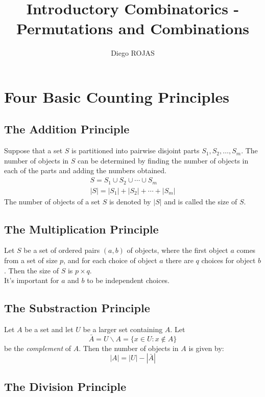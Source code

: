 \documentclass[12pt]{article}
\title{Introductory Combinatorics - Permutations and Combinations}
\author{Diego ROJAS}
\begin{document}
\maketitle

\section{Four Basic Counting Principles}

\subsection{The Addition Principle}

Suppose that a set $S$ is partitioned into pairwise disjoint parts $S_1,S_2, \dots ,S_m$. The number of objects in $S$ can be determined by finding the number of objects in each of the parts and adding the numbers obtained.
%
\begin{equation}
\begin{gathered}
	S = S_1 \cup S_2 \cup \cdots \cup S_m \\
	|S| = |S_1| + |S_2| + \cdots + |S_m|
\end{gathered}
\end{equation}
%
The number of objects of a set $S$ is denoted by $|S|$ and is called the size of $S$.

\subsection{The Multiplication Principle}

Let $S$ be a set of ordered pairs $(a, b)$ of objects, where the first object $a$ comes from a set of size $p$, and for each choice of object $a$ there are $q$ choices for object $b$. Then the size of $S$ is $p \times q$.
\\
It's important for $a$ and $b$ to be independent choices.


\subsection{The Substraction Principle}

Let $A$ be a set and let $U$ be a larger set containing $A$. Let
%
$$
\bar{A} = U \backslash A = \{ x \in U : x \notin A \}
$$
%
be the \textit{complement} of $A$. Then the number of objects in $A$ is given by:
%
$$
|A| = |U| - |\bar{A}|
$$

\subsection{The Division Principle}
\end{document}
